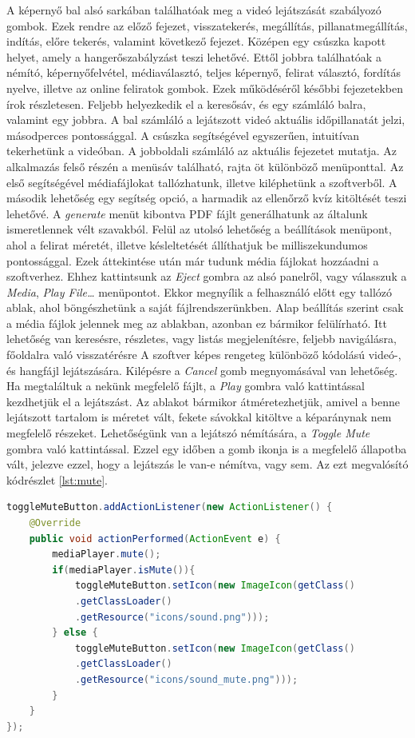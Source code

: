 A képernyő bal alsó sarkában találhatóak meg a videó lejátszását szabályozó gombok. Ezek rendre az előző fejezet, visszatekerés, megállítás, pillanatmegállítás, indítás, előre tekerés, valamint következő fejezet. Középen egy csúszka kapott helyet, amely a hangerőszabályzást teszi lehetővé. Ettől jobbra találhatóak a némító, képernyőfelvétel, médiaválasztó, teljes képernyő, felirat választó, fordítás nyelve, illetve az online feliratok gombok. Ezek működéséről későbbi fejezetekben írok részletesen. Feljebb helyezkedik el a keresősáv, és egy számláló balra, valamint egy jobbra. A bal számláló a lejátszott videó aktuális időpillanatát jelzi, másodperces pontossággal. A csúszka segítségével egyszerűen, intuitívan tekerhetünk a videóban. A jobboldali számláló az aktuális fejezetet mutatja. Az alkalmazás felső részén a menüsáv található, rajta öt különböző menüponttal. Az első segítségével médiafájlokat tallózhatunk, illetve kiléphetünk a szoftverből. A második lehetőség egy segítség opció, a harmadik az ellenőrző kvíz kitöltését teszi lehetővé. A \textit{generate} menüt kibontva PDF fájlt generálhatunk az általunk ismeretlennek vélt szavakból. Felül az utolsó lehetőség a beállítások menüpont, ahol a felirat méretét, illetve késleltetését állíthatjuk be milliszekundumos pontossággal. Ezek áttekintése után már tudunk média fájlokat hozzáadni a szoftverhez. Ehhez kattintsunk az \textit{Eject} gombra az alsó panelről, vagy válasszuk a \textit{Media}, \textit{Play File…} menüpontot. Ekkor megnyílik a felhasználó előtt egy tallózó ablak, ahol böngészhetünk a saját fájlrendszerünkben. Alap beállítás szerint csak a média fájlok jelennek meg az ablakban, azonban ez bármikor felülírható. Itt lehetőség van keresésre, részletes, vagy listás megjelenítésre, feljebb navigálásra, főoldalra való visszatérésre A szoftver képes rengeteg különböző kódolású videó-, és hangfájl lejátszására. Kilépésre a \textit{Cancel} gomb megnyomásával van lehetőség. Ha megtaláltuk a nekünk megfelelő fájlt, a \textit{Play} gombra való kattintással kezdhetjük el a lejátszást. Az ablakot bármikor átméretezhetjük, amivel a benne lejátszott tartalom is méretet vált, fekete sávokkal kitöltve a képaránynak nem megfelelő részeket. Lehetőségünk van a lejátszó némítására, a \textit{Toggle Mute} gombra való kattintással. Ezzel egy időben a gomb ikonja is a megfelelő állapotba vált, jelezve ezzel, hogy a lejátszás le van-e némítva, vagy sem. Az ezt megvalósító kódrészlet \ref{lst:mute}.
\begin{lstlisting}[caption=Némítást implementáló kódrészlet, language=java, label={lst:mute}]
toggleMuteButton.addActionListener(new ActionListener() {
    @Override
    public void actionPerformed(ActionEvent e) {
        mediaPlayer.mute();
        if(mediaPlayer.isMute()){
            toggleMuteButton.setIcon(new ImageIcon(getClass()
            .getClassLoader()
            .getResource("icons/sound.png")));
        } else {
            toggleMuteButton.setIcon(new ImageIcon(getClass()
            .getClassLoader()
            .getResource("icons/sound_mute.png")));
        }
    }
});
\end{lstlisting}


